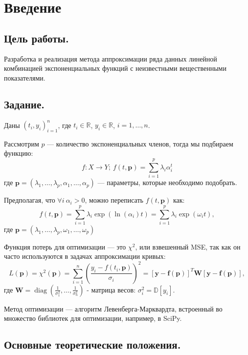 \newpage

\section*{Введение}

\subsection*{Цель работы.}

Разработка и реализация метода аппроксимации ряда данных линейной комбинацией экспоненциальных функций с неизвестными вещественными показателями.

\subsection*{Задание.}
Даны $(t_i, y_i)_{i=1}^n$, где $t_i \in \mathbb{R}$, $y_i \in \mathbb{R}$, $i = 1, \ldots, n$.

Рассмотрим $p$ — количество экспоненциальных членов, тогда мы подбираем функцию:
$$
	f: X \to Y; \:
	f(t, \textbf{p}) =\sum_{i=1}^p\lambda_i\alpha_i^t
$$
где $\textbf{p} = (\lambda_1, \ldots, \lambda_p, \alpha_1, \ldots, \alpha_p)$ — параметры, которые необходимо подобрать.

Предполагая, что $\forall i \:\alpha_i > 0$, можно переписать $f(t, \textbf{p})$ как:
$$
	f(t, \textbf{p})=\sum_{i=1}^p\lambda_i\exp(\ln(\alpha_i)t) =
	\sum_{i=1}^p\lambda_i\exp(\omega_it),
$$
где $\textbf{p} = (\lambda_1, \ldots, \lambda_p, \omega_1, \ldots, \omega_p)$

Функция потерь для оптимизации — это $\chi^2$, или взвешенный MSE, так как он часто используются в задачах аппроксимации кривых:
$$
	L(\mathbf{p}) = \chi^2(\boldsymbol p) = \sum_{i=1}^n\left(\frac{y_i-f(t_i, \boldsymbol p)}{\sigma_i}\right)^2 = \left[\mathbf y - \mathbf f\left ( \mathbf{p}\right )\right ]^T\boldsymbol{W}\left[\mathbf y - \mathbf f\left ( \mathbf{p}\right )\right ],
$$
где $\boldsymbol{W} = \operatorname{diag}\left(\frac{1}{\sigma_1^2}, \ldots, \frac{1}{\sigma_n^2}\right)$ - матрица весов: $\sigma_i^2=\mathbb{D}[y_i]$.

Метод оптимизации — алгоритм Левенберга-Марквардта, встроенный во множество библиотек для оптимизации, например, в SciPy.

\subsection*{Основные теоретические положения.}

